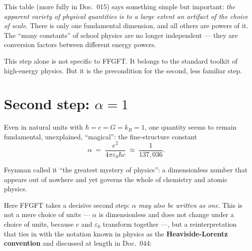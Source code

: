 \begin{center}
\end{center}

This table (more fully in Doc.~015) says something simple but
important: \emph{the apparent variety of physical quantities is to a
large extent an artifact of the choice of scale}. There is only one
fundamental dimension, and all others are powers of it. The ``many
constants'' of school physics are no longer independent --- they are
conversion factors between different energy powers.

This step alone is not specific to FFGFT. It belongs to the standard
toolkit of high-energy physics. But it is the precondition for the
second, less familiar step.

\section{Second step: $\alpha = 1$}

Even in natural units with $\hbar = c = G = k_B = 1$, one quantity
seems to remain fundamental, unexplained, ``magical'': the
fine-structure constant
\[
  \alpha \;=\; \frac{e^{2}}{4\pi\varepsilon_{0}\hbar c} \;\approx\; \frac{1}{137{,}036}.
\]

Feynman called it ``the greatest mystery of physics'': a dimensionless
number that appears out of nowhere and yet governs the whole of
chemistry and atomic physics.

Here FFGFT takes a decisive second step: \emph{$\alpha$ may also be
written as one}. This is not a mere choice of units --- $\alpha$ is
dimensionless and does not change under a choice of units, because $e$
and $\varepsilon_{0}$ transform together ---, but a reinterpretation
that ties in with the notation known in physics as the
\textbf{Heaviside-Lorentz convention} and discussed at length in
Doc.~044:

